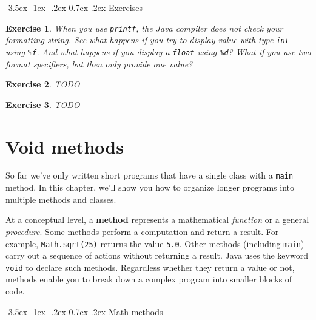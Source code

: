 \documentclass[12pt]{book}
\makeatletter
\renewcommand{\section}{\@startsection {section}{1}{\z@}%
    {-3.5ex \@plus -1ex \@minus -.2ex}%
    {0.7ex \@plus.2ex}%
    {\normalfont\Large\bfseries}}
\theoremstyle{exercise}
\newtheorem{exercise}{Exercise}[chapter]
\newcommand{\java}[1]{\lstinline{#1}} %
\makeatother
\begin{document}
\section{Exercises}

\begin{exercise}
When you use \java{printf}, the Java compiler does not check your formatting string.
See what happens if you try to display value with type \java{int} using \verb"%f".
And what happens if you display a \java{float} using \verb"%d"?
What if you use two format specifiers, but then only provide one value?
\end{exercise}


\begin{exercise}

TODO

\end{exercise}


\begin{exercise}

TODO

\end{exercise}


\chapter{Void methods}

So far we've only written short programs that have a single class with a \java{main} method.
In this chapter, we'll show you how to organize longer programs into multiple methods and classes.



At a conceptual level, a {\bf method} represents a mathematical {\em function} or a general {\em procedure}.
Some methods perform a computation and return a result.
For example, \java{Math.sqrt(25)} returns the value \java{5.0}.
Other methods (including \java{main}) carry out a sequence of actions without returning a result.
Java uses the keyword \java{void} to declare such methods.
Regardless whether they return a value or not, methods enable you to break down a complex program into smaller blocks of code.


\section{Math methods}
\end{document}
